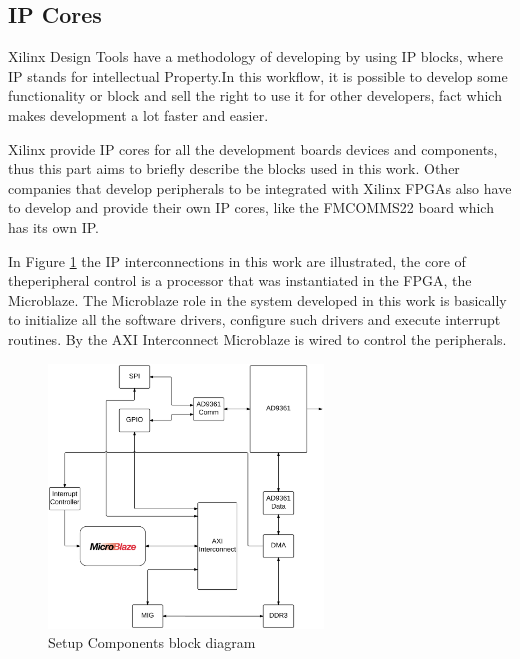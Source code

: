 \subsection{IP Cores}

Xilinx Design Tools have a methodology of developing by using IP blocks, where IP
stands for intellectual Property.In this workflow, it is possible to develop some
functionality or block and sell the right to use it for other developers, fact
which makes development a lot faster and easier.

Xilinx provide IP cores for all the development boards devices and components,
thus this part aims to briefly describe the blocks used in this work. Other
companies that develop peripherals to be integrated with Xilinx FPGAs also have
to develop and provide their own IP cores, like the FMCOMMS22 board which has its
own IP.

In Figure \ref{fig:setupip} the IP interconnections in this work are
illustrated, the core of theperipheral control is a processor that was
instantiated in the FPGA, the Microblaze. The Microblaze role in the system
developed in this work is basically to initialize all the software drivers,
configure such drivers and execute interrupt routines. By the AXI Interconnect
Microblaze is wired to control the peripherals.

\begin{figure}[htbp]
    \centering
    \includegraphics[width=0.65\textwidth]{./figures/setup_ipbd}
    \caption{ Setup Components block diagram
    \label{fig:setupip}}
\end{figure}



